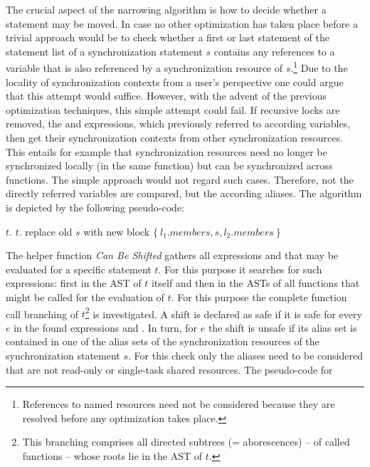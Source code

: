 The crucial aspect of the narrowing algorithm is how to decide whether a statement may be moved. In case no other optimization has taken place before a trivial approach would be to check whether a first or last statement of the statement list of a synchronization statement $s$ contains any references to a variable that is also referenced by a synchronization resource of $s$.\footnote{References to named resources need not be considered because they are resolved before any optimization takes place.} Due to the locality of synchronization contexts from a user's perspective one could argue that this attempt would suffice. However, with the advent of the previous optimization techniques, this simple attempt could fail. If recursive locks are removed, the  and  expressions, which previously referred to according variables, then get their synchronization contexts from other synchronization resources. This entails for example that synchronization resources need no longer be synchronized locally (in the same function) but can be synchronized across functions. The simple approach would not regard such cases. Therefore, not the directly referred variables are compared, but the according aliases. The algorithm is depicted by the following pseudo-code:
\begin{algorithmic}
\State {}
    \State $t$. 
  \EndWhile
    \State $t$. 
  \EndWhile
    \State replace old $s$ with new block $\{\ l_1.\textit{members}, s, l_2.\textit{members}\ \}$
  \EndIf
\EndFor
\EndFunction
\end{algorithmic}
The helper function \textit{Can Be Shifted} gathers all expressions  and  that may be evaluated for a specific statement $t$. For this purpose it searches for such expressions: first in the AST of $t$ itself and then in the ASTs of all functions that might be called for the evaluation of $t$. For this purpose the complete function call branching of $t$\footnote{This branching comprises all directed subtrees (= aborescences) -- of called functions -- whose roots lie in the AST of $t$.} is investigated. A shift is declared as safe if it is safe for every $e$ in the found expressions  and . In turn, for $e$ the shift is unsafe if its alias set is contained in one of the alias sets of the synchronization resources of the synchronization statement $s$. For this check only the aliases need to be considered that are not read-only or single-task shared resources.  The pseudo-code for 
